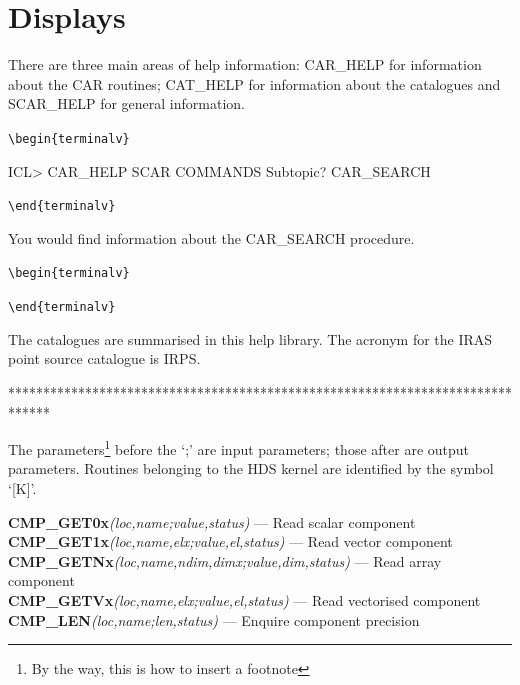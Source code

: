 \documentclass[twoside,11pt]{starlink}
\begin{document}
\newpage

\section{Displays}

\begin{small}
\begin{terminalv}
There are three main areas of help information: CAR\_HELP for information
about the CAR routines; CAT\_HELP for information about the catalogues and
SCAR\_HELP for general information.
\end{terminalv}
\verb+\begin{terminalv}+
\begin{terminalv}
ICL> CAR_HELP
SCAR COMMANDS Subtopic? CAR_SEARCH
\end{terminalv}
\verb+\end{terminalv}+
\begin{terminalv}
You would find information about the CAR\_SEARCH procedure.
\end{terminalv}
\verb+\begin{terminalv}+
\verb+\end{terminalv}+
\begin{terminalv}
The catalogues are summarised in this help library.
The acronym for the IRAS point source catalogue is IRPS.

******************************************************************************

The parameters\footnote{By the way, this is how to insert a footnote} before
the `;' are input parameters; those after are output parameters.
Routines belonging to the HDS kernel are identified by the symbol `[K]'.

\noindent
\textbf{CMP\_GET0x}\emph{(loc,name;value,status)} --- Read scalar component\\
\textbf{CMP\_GET1x}\emph{(loc,name,elx;value,el,status)} --- Read vector component\\
\textbf{CMP\_GETNx}\emph{(loc,name,ndim,dimx;value,dim,status)} --- Read array
component\\
\textbf{CMP\_GETVx}\emph{(loc,name,elx;value,el,status)} --- Read vectorised
component\\
\textbf{CMP\_LEN}\emph{(loc,name;len,status)} --- Enquire component precision\\


\end{terminalv}
\end{small}
\end{document}
